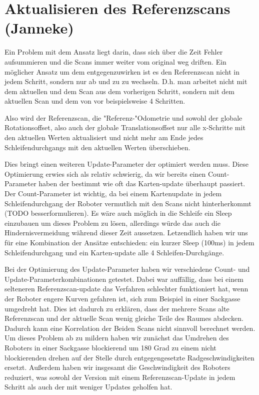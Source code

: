 \section{Aktualisieren des Referenzscans (Janneke)}

Ein Problem mit dem Ansatz liegt darin, dass sich über die Zeit Fehler aufsummieren und die Scans immer weiter vom original weg driften. Ein möglicher Ansatz um dem entgegenzuwirken ist es den Referenzscan nicht in jedem Schritt, sondern nur ab und zu zu wechseln. D.h. man arbeitet nicht mit dem aktuellen und dem Scan aus dem vorherigen Schritt, sondern mit dem aktuellen Scan und dem von vor beispielsweise 4 Schritten.

Also wird der Referenzscan, die "Referenz-"Odometrie und sowohl der globale Rotationsoffset, also auch der globale Translationsoffset nur alle x-Schritte mit den aktuellen Werten aktualisiert und nicht mehr am Ende jedes Schleifendurchgangs mit den aktuellen Werten überschieben. 

Dies bringt einen weiteren Update-Parameter der optimiert werden muss. Diese Optimierung erwies sich als relativ schwierig, da wir bereits einen Count-Parameter haben der bestimmt wie oft das Karten-update überhaupt passiert. Der Count-Parameter ist wichtig, da bei einem Kartenupdate in jedem Schleifendurchgang der Roboter vermutlich mit den Scans nicht hinterherkommt (TODO besserformulieren). Es wäre auch möglich in die Schleife ein Sleep einzubauen um dieses Problem zu lösen, allerdings würde das auch die Hindernisvermeidung während dieser Zeit aussetzen. Letzendlich haben wir uns für eine Kombination der Ansätze entschieden: ein kurzer Sleep (100ms) in jedem Schleifendurchgang und ein Karten-update alle 4 Schleifen-Durchgänge.

Bei der Optimierung des Update-Parameter haben wir verschiedene Count- und Update-Parameterkombinationen getestet. Dabei war auffällig, dass bei einem selteneren Referenzscan-update das Verfahren schlechter funktioniert hat, wenn der Roboter engere Kurven gefahren ist, sich zum Beispiel in einer Sackgasse umgedreht hat. Dies ist dadurch zu erklären, dass der mehrere Scans alte Referenzscan und der aktuelle Scan wenig gleiche Teile des Raumes abdecken. Dadurch kann eine Korrelation der Beiden Scans nicht sinnvoll berechnet werden. Um dieses Problem ab zu mildern haben wir zunächst das Umdrehen des Roboters in einer Sackgasse blockierend um 180 Grad zu einem nicht blockierenden drehen auf der Stelle durch entgegengesetzte Radgeschwindigkeiten ersetzt. Außerdem haben wir insgesamt die Geschwindigkeit des Roboters reduziert, was sowohl der Version mit einem Referenzscan-Update in jedem Schritt als auch der mit weniger Updates geholfen hat.


